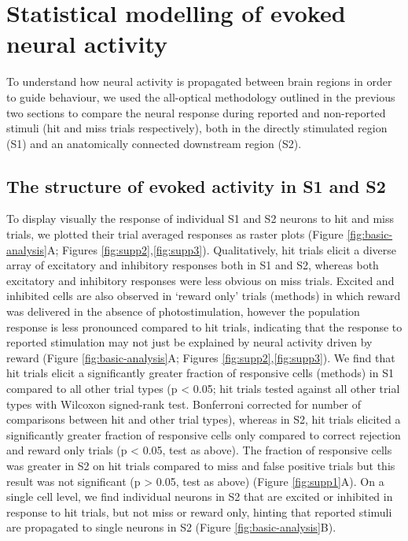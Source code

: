 \chapter{\label{res3}Statistical modelling of evoked neural activity
}

\minitoc

To understand how neural activity is propagated between brain regions in order to guide behaviour, we used the all-optical methodology outlined in the previous two sections to compare the neural response during reported and non-reported stimuli (hit and miss trials respectively), both in the directly stimulated region (S1) and an anatomically connected downstream region (S2). 

\section{The structure of evoked activity in S1 and S2}

To display visually the response of individual S1 and S2 neurons to hit and miss trials, we plotted their trial averaged responses as raster plots (Figure \ref{fig:basic-analysis}A; Figures \ref{fig:supp2},\ref{fig:supp3}). Qualitatively, hit trials elicit a diverse array of excitatory and inhibitory responses both in S1 and S2, whereas both excitatory and inhibitory responses were less obvious on miss trials. Excited and inhibited cells are also observed in ‘reward only’ trials (methods) in which reward was delivered in the absence of photostimulation, however the population response is less pronounced compared to hit trials, indicating that the response to reported stimulation may not just be explained by neural activity driven by reward (Figure \ref{fig:basic-analysis}A; Figures \ref{fig:supp2},\ref{fig:supp3}). We find that hit trials elicit a significantly greater fraction of responsive cells (methods) in S1 compared to all other trial types (p < 0.05; hit trials tested against all other trial types with Wilcoxon signed-rank test. Bonferroni corrected for number of comparisons between hit and other trial types), whereas in S2, hit trials elicited a significantly greater fraction of responsive cells only compared to correct rejection and reward only trials (p < 0.05, test as above). The fraction of responsive cells was greater in S2 on hit trials compared to miss and false positive trials but this result was not significant (p > 0.05, test as above) (Figure \ref{fig:supp1}A). On a single cell level, we find individual neurons in S2 that are excited or inhibited in response to hit trials, but not miss or reward only, hinting that reported stimuli are propagated to single neurons in S2 (Figure \ref{fig:basic-analysis}B).

